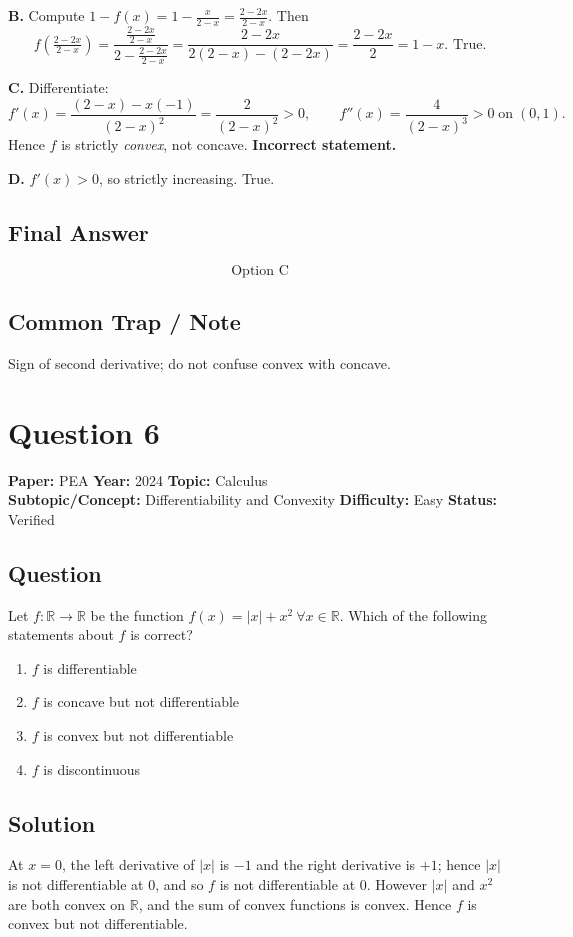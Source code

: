 \documentclass[11pt]{article}
\begin{document}
\textbf{B.} Compute $1-f(x) = 1-\tfrac{x}{2-x}=\tfrac{2-2x}{2-x}$. Then
\[
f\!\left(\tfrac{2-2x}{2-x}\right)
=\frac{\frac{2-2x}{2-x}}{2-\frac{2-2x}{2-x}}
=\frac{2-2x}{2(2-x)-(2-2x)}
=\frac{2-2x}{2}=1-x. \text{ True.}
\]

\textbf{C.} Differentiate:
\[
f'(x)=\frac{(2-x)-x(-1)}{(2-x)^2}=\frac{2}{(2-x)^2}>0,\qquad
f''(x)=\frac{4}{(2-x)^3}>0\;\text{on}\;(0,1).
\]
Hence $f$ is strictly \emph{convex}, not concave. \textbf{Incorrect statement.}

\textbf{D.} $f'(x)>0$, so strictly increasing. True.

\subsection*{Final Answer}
\[
\boxed{\text{Option C}}
\]

\subsection*{Common Trap / Note}
Sign of second derivative; do not confuse convex with concave.

\section*{Question 6}
\textbf{Paper:} PEA \quad \textbf{Year:} 2024 \quad \textbf{Topic:} Calculus \\
\textbf{Subtopic/Concept:} Differentiability and Convexity \quad \textbf{Difficulty:} Easy \quad \textbf{Status:} Verified

\subsection*{Question}
Let $f:\mathbb{R}\to\mathbb{R}$ be the function $f(x)=|x|+x^{2}\ \forall x\in\mathbb{R}$. Which of the following statements about $f$ is correct?
\begin{enumerate}[label=(\Alph*)]
\item $f$ is differentiable
\item $f$ is concave but not differentiable
\item $f$ is convex but not differentiable
\item $f$ is discontinuous
\end{enumerate}

\subsection*{Solution}
At $x=0$, the left derivative of $|x|$ is $-1$ and the right derivative is $+1$; hence $|x|$ is not differentiable at $0$, and so $f$ is not differentiable at $0$. However $|x|$ and $x^{2}$ are both convex on $\mathbb{R}$, and the sum of convex functions is convex. Hence $f$ is convex but not differentiable.
\end{document}
